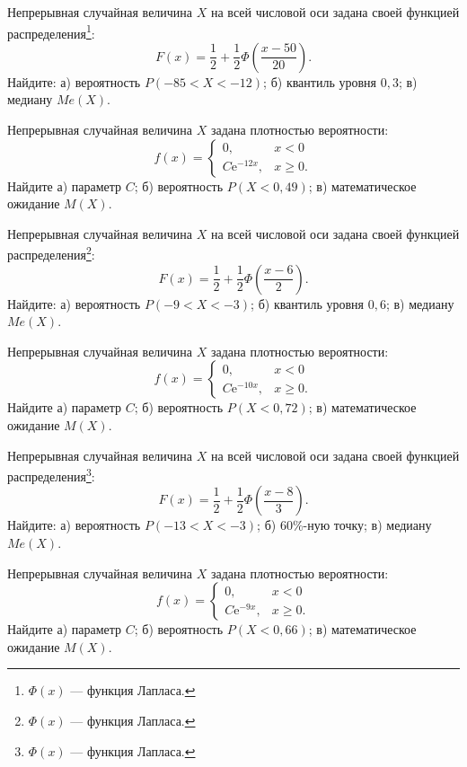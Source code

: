 \vfill

\newpage\setcounter{zad}{0}

\z Непрерывная случайная величина $X$ на всей числовой оси задана своей функцией распределения\footnote{$\Phi(x)$ --- функция Лапласа.}: $$ F(x) = \frac{1}{2} + \frac{1}{2}\Phi\left( \frac{x - 50}{20} \right). $$ Найдите: а) вероятность $P(-85 < X < -12)$; б) квантиль уровня $0{,}3$; в) медиану $Me(X)$.


\vfill

\z Непрерывная случайная величина $X$ задана плотностью вероятности: $$ f(x) = \begin{cases}0, & x < 0 \\ C\mathrm{e}^{-12x}, & x \geqslant 0.\end{cases} $$ Найдите а) параметр $C$; б) вероятность $P(X < 0{,}49)$; в) математическое ожидание $M(X)$.
 

\vfill

\newpage\setcounter{zad}{0}

\z Непрерывная случайная величина $X$ на всей числовой оси задана своей функцией распределения\footnote{$\Phi(x)$ --- функция Лапласа.}: $$ F(x) = \frac{1}{2} + \frac{1}{2}\Phi\left( \frac{x - 6}{2} \right). $$ Найдите: а) вероятность $P(-9 < X < -3)$; б) квантиль уровня $0{,}6$; в) медиану $Me(X)$.


\vfill

\z Непрерывная случайная величина $X$ задана плотностью вероятности: $$ f(x) = \begin{cases}0, & x < 0 \\ C\mathrm{e}^{-10x}, & x \geqslant 0.\end{cases} $$ Найдите а) параметр $C$; б) вероятность $P(X < 0{,}72)$; в) математическое ожидание $M(X)$.
 

\vfill

\newpage\setcounter{zad}{0}

\z Непрерывная случайная величина $X$ на всей числовой оси задана своей функцией распределения\footnote{$\Phi(x)$ --- функция Лапласа.}: $$ F(x) = \frac{1}{2} + \frac{1}{2}\Phi\left( \frac{x - 8}{3} \right). $$ Найдите: а) вероятность $P(-13 < X < -3)$; б) $60\%$-ную точку; в) медиану $Me(X)$.


\vfill

\z Непрерывная случайная величина $X$ задана плотностью вероятности: $$ f(x) = \begin{cases}0, & x < 0 \\ C\mathrm{e}^{-9x}, & x \geqslant 0.\end{cases} $$ Найдите а) параметр $C$; б) вероятность $P(X < 0{,}66)$; в) математическое ожидание $M(X)$.
 

